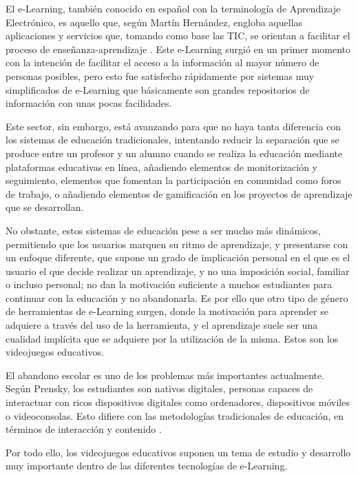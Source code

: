 El e-Learning, también conocido en español con la terminología de Aprendizaje Electrónico, es aquello que, según Martín Hernández, engloba aquellas aplicaciones y servicios que, tomando como base las TIC, se orientan a facilitar el proceso de enseñanza-aprendizaje \cite{BaeloAlvarez2009}. Este e-Learning surgió en un primer momento con la intención de facilitar el acceso a la información al mayor número de personas posibles, pero esto fue satisfecho rápidamente por sistemas muy simplificados de e-Learning que básicamente son grandes repositorios de información con unas pocas facilidades.

Este sector, sin embargo, está avanzando para que no haya tanta diferencia con los sistemas de educación tradicionales, intentando reducir la separación que se produce entre un profesor y un alumno cuando se realiza la educación mediante plataformas educativas en línea, añadiendo elementos de monitorización y seguimiento, elementos que fomentan la participación en comunidad como foros de trabajo, o añadiendo elementos de gamificación en los proyectos de aprendizaje que se desarrollan.

No obstante, estos sistemas de educación pese a ser mucho más dinámicos, permitiendo que los usuarios marquen su ritmo de aprendizaje, y presentarse con un enfoque diferente, que supone un grado de implicación personal en el que es el usuario el que decide realizar un aprendizaje, y no una imposición social, familiar o incluso personal; no dan la motivación suficiente a muchos estudiantes para continuar con la educación y no abandonarla. Es por ello que otro tipo de género de herramientas de e-Learning surgen, donde la motivación para aprender se adquiere a través del uso de la herramienta, y el aprendizaje suele ser una cualidad implícita que se adquiere por la utilización de la misma. Estos son los videojuegos educativos.

El abandono escolar es uno de los problemas más importantes actualmente. Según Prensky, los estudiantes son nativos digitales, personas capaces de interactuar con ricos dispositivos digitales como ordenadores, dispositivos móviles o videoconsolas. Esto difiere con las metodologías tradicionales de educación, en términos de interacción y contenido \cite{Torrente2010}.

Por todo ello, los videojuegos educativos suponen un tema de estudio y desarrollo muy importante dentro de las diferentes tecnologías de e-Learning.


